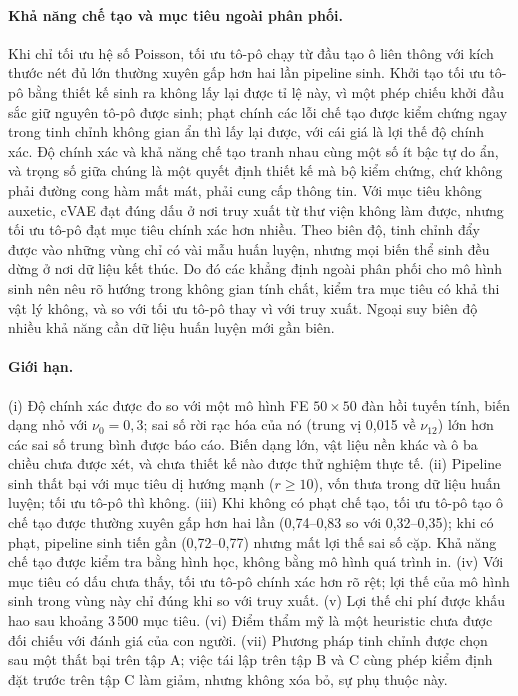 \documentclass[a4paper,11pt]{article}
\newcommand{\nuot}{\nu_{12}}
\begin{document}
\paragraph{Khả năng chế tạo và mục tiêu ngoài phân phối.}
Khi chỉ tối ưu hệ số Poisson, tối ưu tô-pô chạy từ đầu tạo ô liên thông với
kích thước nét đủ lớn thường xuyên gấp hơn hai lần pipeline sinh. Khởi tạo tối
ưu tô-pô bằng thiết kế sinh ra không lấy lại được tỉ lệ này, vì một phép chiếu
khởi đầu sắc giữ nguyên tô-pô được sinh; phạt chính các lỗi chế tạo được kiểm
chứng ngay trong tinh chỉnh không gian ẩn thì lấy lại được, với cái giá là
lợi thế độ chính xác. Độ chính xác và khả năng chế tạo tranh nhau cùng một số
ít bậc tự do ẩn, và trọng số giữa chúng là một quyết định thiết kế mà bộ kiểm
chứng, chứ không phải đường cong hàm mất mát, phải cung cấp thông tin. Với mục tiêu không
auxetic, cVAE đạt đúng dấu ở nơi truy xuất từ thư viện không làm được, nhưng
tối ưu tô-pô đạt mục tiêu chính xác hơn nhiều. Theo biên độ, tinh chỉnh đẩy
được vào những vùng chỉ có vài mẫu huấn luyện, nhưng mọi biến thể sinh đều
dừng ở nơi dữ liệu kết thúc. Do đó các khẳng định ngoài phân phối cho mô hình
sinh nên nêu rõ hướng trong không gian tính chất, kiểm tra mục tiêu có khả
thi vật lý không, và so với tối ưu tô-pô thay vì với truy xuất. Ngoại suy biên
độ nhiều khả năng cần dữ liệu huấn luyện mới gần biên.

\paragraph{Giới hạn.}
(i) Độ chính xác được đo so với một mô hình FE $50\times50$ đàn hồi tuyến
tính, biến dạng nhỏ với $\nu_0=0,3$; sai số rời rạc hóa của nó (trung vị
0,015 về $\nuot$) lớn hơn các sai số trung bình được báo cáo. Biến dạng lớn,
vật liệu nền khác và ô ba chiều chưa được xét, và chưa thiết kế nào được thử
nghiệm thực tế.
(ii) Pipeline sinh thất bại với mục tiêu dị hướng mạnh ($r\ge10$), vốn thưa
trong dữ liệu huấn luyện; tối ưu tô-pô thì không.
(iii) Khi không có phạt chế tạo, tối ưu tô-pô tạo ô chế tạo được thường xuyên
gấp hơn hai lần (0,74--0,83 so với 0,32--0,35); khi có phạt, pipeline sinh tiến
gần (0,72--0,77) nhưng mất lợi thế sai số cặp. Khả năng chế tạo được kiểm tra
bằng hình học, không bằng mô hình quá trình in.
(iv) Với mục tiêu có dấu chưa thấy, tối ưu tô-pô chính xác hơn rõ rệt; lợi
thế của mô hình sinh trong vùng này chỉ đúng khi so với truy xuất.
(v) Lợi thế chi phí được khấu hao sau khoảng 3\,500 mục tiêu.
(vi) Điểm thẩm mỹ là một heuristic chưa được đối chiếu với đánh giá của con
người.
(vii) Phương pháp tinh chỉnh được chọn sau một thất bại trên tập A; việc tái
lập trên tập B và C cùng phép kiểm định đặt trước trên tập C làm giảm, nhưng
không xóa bỏ, sự phụ thuộc này.
\end{document}
